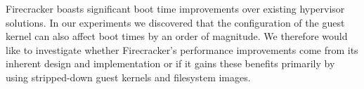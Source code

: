 Firecracker boasts significant boot time improvements over existing hypervisor
solutions. In our experiments we discovered that the configuration of the guest
kernel can also affect boot times by an order of magnitude. We therefore would
like to investigate whether Firecracker's performance improvements come from
its inherent design and implementation or if it gains these benefits primarily
by using stripped-down guest kernels and filesystem images.
